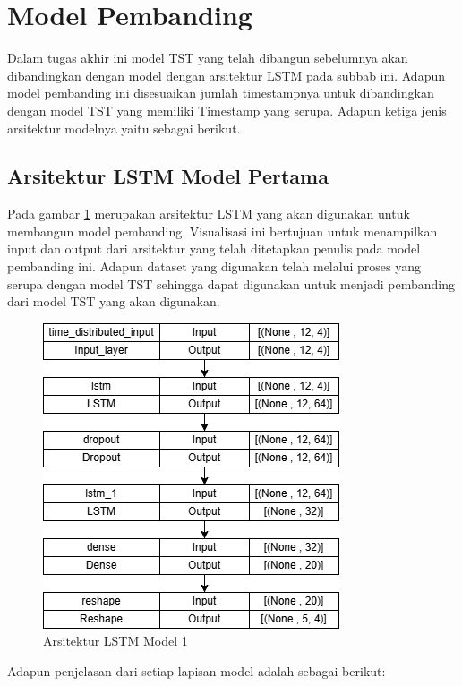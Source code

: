 \section{Model Pembanding}
Dalam tugas akhir ini model TST yang telah dibangun sebelumnya akan dibandingkan dengan model dengan arsitektur LSTM pada subbab ini. Adapun model pembanding ini disesuaikan jumlah timestampnya untuk dibandingkan dengan model TST yang memiliki Timestamp yang serupa. Adapun ketiga jenis arsitektur modelnya yaitu sebagai berikut.

\subsection{Arsitektur LSTM Model Pertama}
Pada gambar \ref{fig:lstm1} merupakan arsitektur LSTM yang akan digunakan untuk membangun model pembanding. Visualisasi ini bertujuan untuk menampilkan input dan output dari arsitektur yang telah ditetapkan penulis pada model pembanding ini. Adapun dataset yang digunakan telah melalui proses yang serupa dengan model TST sehingga dapat digunakan untuk menjadi pembanding dari model TST yang akan digunakan.

\begin{figure} [H] \centering
    \includegraphics[scale=0.65]{gambar/lstmmodel1.png} 
    \caption{Arsitektur LSTM Model 1}
    \label{fig:lstm1}
\end{figure}

Adapun penjelasan dari setiap lapisan model adalah sebagai berikut:


